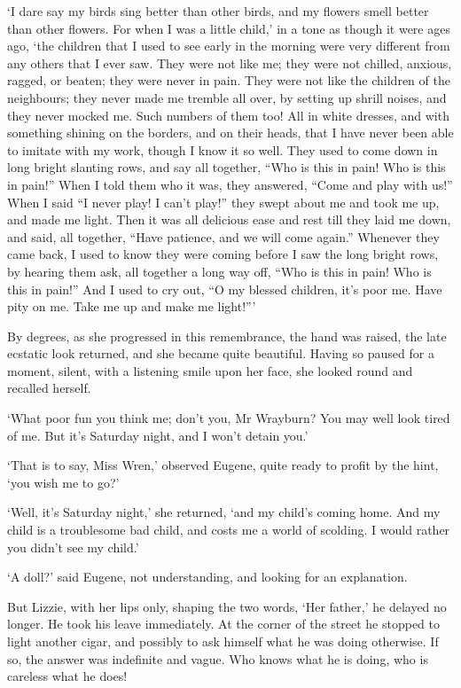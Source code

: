 ‘I dare say my birds sing better than other birds, and my flowers smell
better than other flowers. For when I was a little child,’ in a tone as
though it were ages ago, ‘the children that I used to see early in the
morning were very different from any others that I ever saw. They were
not like me; they were not chilled, anxious, ragged, or beaten; they
were never in pain. They were not like the children of the neighbours;
they never made me tremble all over, by setting up shrill noises, and
they never mocked me. Such numbers of them too! All in white dresses,
and with something shining on the borders, and on their heads, that I
have never been able to imitate with my work, though I know it so
well. They used to come down in long bright slanting rows, and say all
together, “Who is this in pain! Who is this in pain!” When I told them
who it was, they answered, “Come and play with us!” When I said “I never
play! I can’t play!” they swept about me and took me up, and made me
light. Then it was all delicious ease and rest till they laid me
down, and said, all together, “Have patience, and we will come again.”
 Whenever they came back, I used to know they were coming before I saw
the long bright rows, by hearing them ask, all together a long way off,
“Who is this in pain! Who is this in pain!” And I used to cry out, “O my
blessed children, it’s poor me. Have pity on me. Take me up and make me
light!”’

By degrees, as she progressed in this remembrance, the hand was raised,
the late ecstatic look returned, and she became quite beautiful. Having
so paused for a moment, silent, with a listening smile upon her face,
she looked round and recalled herself.

‘What poor fun you think me; don’t you, Mr Wrayburn? You may well look
tired of me. But it’s Saturday night, and I won’t detain you.’

‘That is to say, Miss Wren,’ observed Eugene, quite ready to profit by
the hint, ‘you wish me to go?’

‘Well, it’s Saturday night,’ she returned, ‘and my child’s coming
home. And my child is a troublesome bad child, and costs me a world of
scolding. I would rather you didn’t see my child.’

‘A doll?’ said Eugene, not understanding, and looking for an
explanation.

But Lizzie, with her lips only, shaping the two words, ‘Her father,’ he
delayed no longer. He took his leave immediately. At the corner of the
street he stopped to light another cigar, and possibly to ask himself
what he was doing otherwise. If so, the answer was indefinite and vague.
Who knows what he is doing, who is careless what he does!


